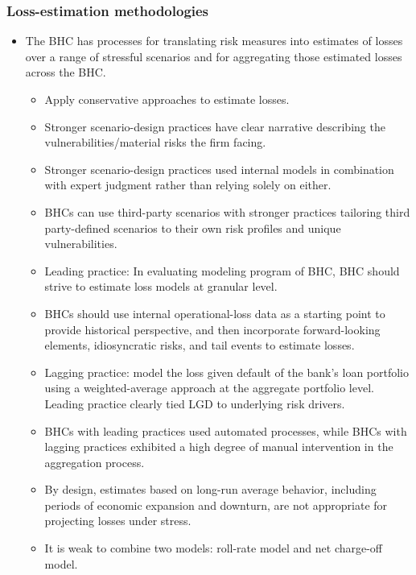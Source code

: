 \subsubsection{Loss-estimation methodologies}
\begin{itemize}
\item The BHC has processes for translating risk measures into estimates of losses over a range of stressful scenarios and for aggregating those estimated losses across the BHC.
    \begin{itemize}
    \item Apply conservative approaches to estimate losses.
    \item Stronger scenario-design practices have clear narrative describing the vulnerabilities/material risks the firm facing.
    \item Stronger scenario-design practices used internal models in combination with expert judgment rather than relying solely on either.
    \item BHCs can use third-party scenarios with stronger practices tailoring third party-defined scenarios to their own risk profiles and unique vulnerabilities.
    \item Leading practice: In evaluating modeling program of BHC, BHC should strive to estimate loss models at granular level.
    \item BHCs should use internal operational-loss data as a starting point to provide historical perspective, and then incorporate forward-looking elements, idiosyncratic risks, and tail events to estimate losses.
    \item Lagging practice: model the loss given default of the bank's loan portfolio using a weighted-average approach at the aggregate portfolio level. Leading practice clearly tied LGD to underlying risk drivers.
    \item BHCs with leading practices used automated processes, while BHCs with lagging practices exhibited a high degree of manual intervention in the aggregation process.
    \item By design, estimates based on long-run average behavior, including periods of economic expansion and downturn, are not appropriate for projecting losses under stress.
    \item It is weak to combine two models: roll-rate model and net charge-off model.
    \end{itemize} 
\end{itemize}


